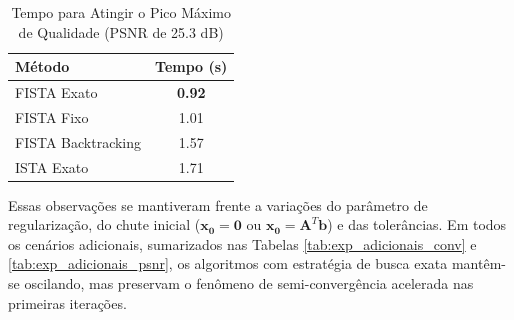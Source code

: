 \documentclass[12pt]{article}
\begin{document}
\begin{table}[H]
    \centering
    \caption{Tempo para Atingir o Pico Máximo de Qualidade (PSNR de 25.3 dB)}
    \label{tab:psnr_tc_wavelet}
    \begin{tabular}{lc}
        \toprule
        \textbf{Método} & \textbf{Tempo (s)} \\
        \midrule
        FISTA Exato & \textbf{0.92} \\
        FISTA Fixo & 1.01 \\
        FISTA Backtracking & 1.57 \\
        ISTA Exato & 1.71 \\
        \bottomrule
    \end{tabular}
\end{table}

Essas observações se mantiveram frente a variações do parâmetro de regularização, do chute inicial ($\mathbf{x_0} = \mathbf{0}$ ou $\mathbf{x_0} = \mathbf{A}^T\mathbf{b}$) e das tolerâncias. Em todos os cenários adicionais, sumarizados nas Tabelas \ref{tab:exp_adicionais_conv} e \ref{tab:exp_adicionais_psnr}, os algoritmos com estratégia de busca exata mantêm-se oscilando, mas preservam o fenômeno de semi-convergência acelerada nas primeiras iterações.

\begin{table}[H]
    \centering
    \caption{Convergência Temporal e Iterativa sob Variação de Cenários de Tomografia}
    \label{tab:exp_adicionais_conv}
\end{table}
\end{document}
